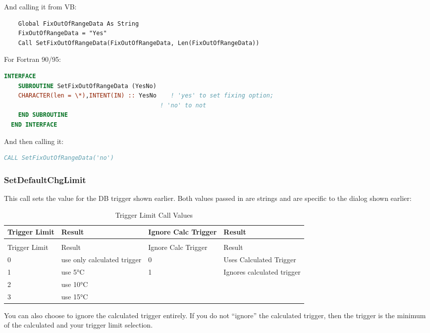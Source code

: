 And calling it from VB:

\begin{lstlisting}
    Global FixOutOfRangeData As String
    FixOutOfRangeData = "Yes"
    Call SetFixOutOfRangeData(FixOutOfRangeData, Len(FixOutOfRangeData))
\end{lstlisting}

For Fortran 90/95:

\begin{lstlisting}[language=Fortran]
  INTERFACE
    SUBROUTINE SetFixOutOfRangeData (YesNo)
    CHARACTER(len = \*),INTENT(IN) :: YesNo    ! 'yes' to set fixing option;
                                            ! 'no' to not
    END SUBROUTINE
  END INTERFACE
\end{lstlisting}

And then calling it:

\begin{lstlisting}[language=Fortran]
CALL SetFixOutOfRangeData('no')
\end{lstlisting}

\subsubsection{SetDefaultChgLimit}\label{setdefaultchglimit}

This call sets the value for the DB trigger shown earlier. Both values passed in are strings and are specific to the dialog shown earlier:

\begin{longtable}[c]{p{1.5in}p{1.5in}p{1.5in}p{1.5in}}
\caption{Trigger Limit Call Values \label{table:trigger-limit-call-values}} \tabularnewline
\toprule 
Trigger Limit & Result & Ignore Calc Trigger & Result \tabularnewline
\midrule
\endfirsthead

\caption[]{Trigger Limit Call Values} \tabularnewline
\toprule 
Trigger Limit & Result & Ignore Calc Trigger & Result \tabularnewline
\midrule
\endhead

0 & use only calculated trigger & 0 & Uses Calculated Trigger \tabularnewline
1 & use 5°C & 1 & Ignores calculated trigger \tabularnewline
2 & use 10°C &  &  \tabularnewline
3 & use 15°C &  &  \tabularnewline
\bottomrule
\end{longtable}

You can also choose to ignore the calculated trigger entirely. If you do not ``ignore'' the calculated trigger, then the trigger is the minimum of the calculated and your trigger limit selection.

